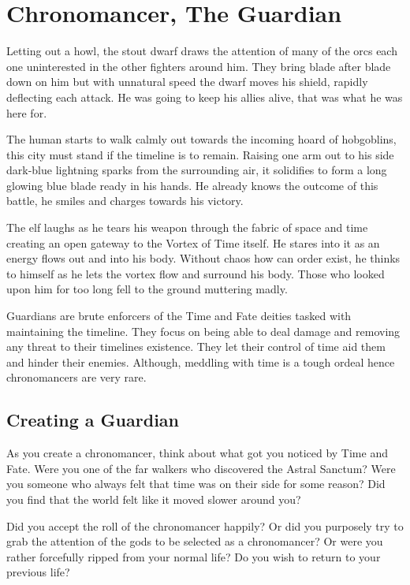 \section{Chronomancer, The Guardian}

Letting out a howl, the stout dwarf draws the attention of many of the orcs each one uninterested in the other fighters around him. They bring blade after blade down on him but with unnatural speed the dwarf moves his shield, rapidly deflecting each attack. He was going to keep his allies alive, that was what he was here for.

The human starts to walk calmly out towards the incoming hoard of hobgoblins, this city must stand if the timeline is to remain. Raising one arm out to his side dark-blue lightning sparks from the surrounding air, it solidifies to form a long glowing blue blade ready in his hands. He already knows the outcome of this battle, he smiles and charges towards his victory.

The elf laughs as he tears his weapon through the fabric of space and time creating an open gateway to the Vortex of Time itself. He stares into it as an energy flows out and into his body. Without chaos how can order exist, he thinks to himself as he lets the vortex flow and surround his body. Those who looked upon him for too long fell to the ground muttering madly.

\newpage

Guardians are brute enforcers of the Time and Fate deities tasked with maintaining the timeline. They focus on being able to deal damage and removing any threat to their timelines existence. They let their control of time aid them and hinder their enemies. Although, meddling with time is a tough ordeal hence chronomancers are very rare.

\subsection{Creating a Guardian}

As you create a chronomancer, think about what got you noticed by Time and Fate. Were you one of the far walkers who discovered the Astral Sanctum? Were you someone who always felt that time was on their side for some reason? Did you find that the world felt like it moved slower around you?

Did you accept the roll of the chronomancer happily? Or did you purposely try to grab the attention of the gods to be selected as a chronomancer? Or were you rather forcefully ripped from your normal life? Do you wish to return to your previous life?

